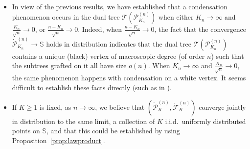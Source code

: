 \documentclass[10pt]{amsart}
\theoremstyle{definition}\newtheorem{defi}[theo]{Definition}\newtheorem{rema}[theo]{Remark}\newtheorem{exam}[theo]{Example}\newtheorem{exem}[theo]{Example}\newtheorem{nota}[theo]{Notation}
\def\S{\mathbb{S}}
\def\PKn{\mathcal{P}^{(n)}_{K_{n}}}
\def\dPKn{\dot{\mathcal{P}}^{(n)}_{K_{n}}}
\begin{document}
\begin{remark}~
\begin{itemize}
\item In view of the previous results, we have established that a condensation phenomenon occurs in the dual tree $ \mathcal{T}(\PKn)$ when either $K_{n} \rightarrow \infty$ and $\tfrac{K_{n}}{\sqrt{n}} \rightarrow 0$, or $\tfrac{n-K_{n}}{\sqrt{n}} \rightarrow 0$. Indeed, when  $\tfrac{n-K_{n}}{\sqrt{n}} \rightarrow 0$, the fact that the convergence $\dPKn {\rightarrow} \S$ holds in distribution indicates that the dual tree  $ \mathcal{T}(\PKn)$ contains a unique (black) vertex of macroscopic degree (of order $n$)  such that the subtrees grafted on it all have size $o(n)$.  When $K_{n} \rightarrow \infty$ and $\tfrac{K_{n}}{\sqrt{n}} \rightarrow 0$, the same phenomenon happens with condensation on a white vertex.  It seems difficult to establish these facts directly (such as in \cite{AL11,Jan12,Kor15}).
\item If $K \geq 1$ is fixed, as $n \rightarrow \infty$, we believe that $(\dot{\mathcal{P}}^{(n)}_{K},\dot{\mathcal{F}}^{(n)}_{K})$ converge jointly in distribution to the same limit, a collection of $K$ i.i.d.~uniformly distributed points on $\S$, and that this could be established by using Proposition~\ref{prop:lawproduct}.
\end{itemize}
\end{remark}

%
\end{document}
